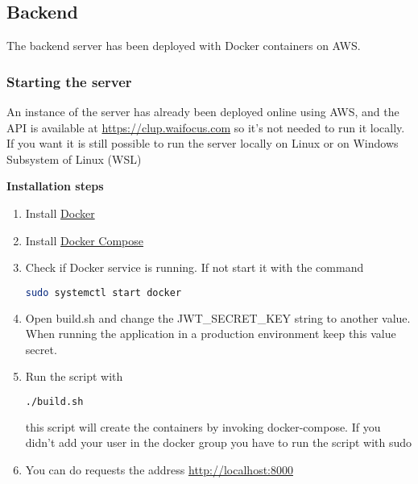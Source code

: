 \subsection{Backend}
The backend server has been deployed with Docker containers on AWS.



\subsubsection{Starting the server}
An instance of the server has already been deployed online using AWS, and the API is available at \href{https://clup.waifocus.com}{https://clup.waifocus.com} so it's not needed to run it locally.
If you want it is still possible to run the server locally on Linux or on Windows Subsystem of Linux (WSL)

\textbf{Installation steps}
\begin{enumerate}
    \item Install \href{https://docs.docker.com/get-docker/}{Docker}
    \item Install \href{https://docs.docker.com/compose/install/}{Docker Compose}
    \item Check if Docker service is running. If not start it with the command
          \begin{lstlisting}[language=bash]
    sudo systemctl start docker
    \end{lstlisting}
    \item  Open build.sh and change the JWT\_SECRET\_KEY string to another value. When running the application in a production environment keep this value secret.
    \item Run the script with
          \begin{lstlisting}[language=bash]
    ./build.sh
    \end{lstlisting}
          this script will create the containers by invoking docker-compose. If you didn't add your user in the docker group
          you have to run the script with sudo
    \item You can do requests the address \href{http://localhost:8000}{http://localhost:8000}
\end{enumerate}

\clearpage

